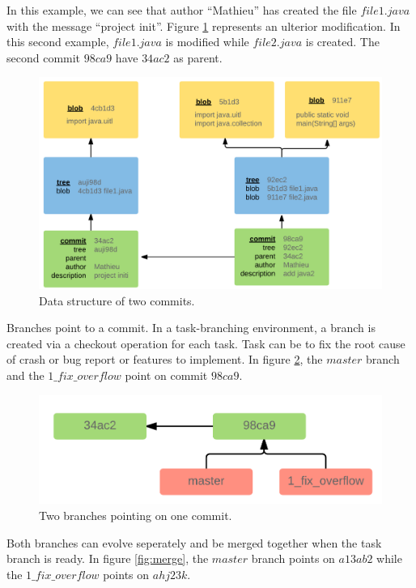 In this example, we can see that author ``Mathieu'' has created the file $file1.java$ with the message ``project init''.
Figure \ref{fig:two-commits} represents an ulterior modification.
In this second example, $file1.java$ is modified while $file2.java$ is created.
The second commit $98ca9$ have $34ac2$ as parent.

\begin{figure}[h!]
  \centering
    \includegraphics[scale=0.25]{media/branching.png}
    \caption{Data structure of two commits.
    \label{fig:two-commits}}
\end{figure}

Branches point to a commit.
In a task-branching environment, a branch is created via a checkout operation for each task.
Task can be to fix the root cause of crash or bug report or features to implement.
In figure \ref{fig:two-branches}, the $master$ branch and the $1\_fix\_overflow$ point on commit $98ca9$.

\begin{figure}[h!]
  \centering
    \includegraphics[scale=0.25]{media/2branches.png}
    \caption{Two branches pointing on one commit.
    \label{fig:two-branches}}
\end{figure}

Both branches can evolve seperately and be merged together when the task branch is ready.
In figure \ref{fig:merge}, the $master$ branch points on $a13ab2$ while the $1\_fix\_overflow$ points on $ahj23k$.

